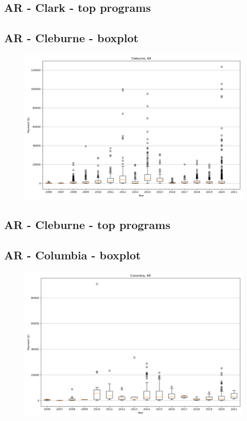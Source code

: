 \subsection*{AR - Clark - top programs}

\newpage
\subsection*{AR - Cleburne - boxplot}
\begin{figure}[h]
\centering
\includegraphics[width=7in]{../output/boxplots/counties/Cleburne-AR_boxplot.png}
\end{figure}


\subsection*{AR - Cleburne - top programs}

\newpage
\subsection*{AR - Columbia - boxplot}
\begin{figure}[h]
\centering
\includegraphics[width=7in]{../output/boxplots/counties/Columbia-AR_boxplot.png}
\end{figure}


